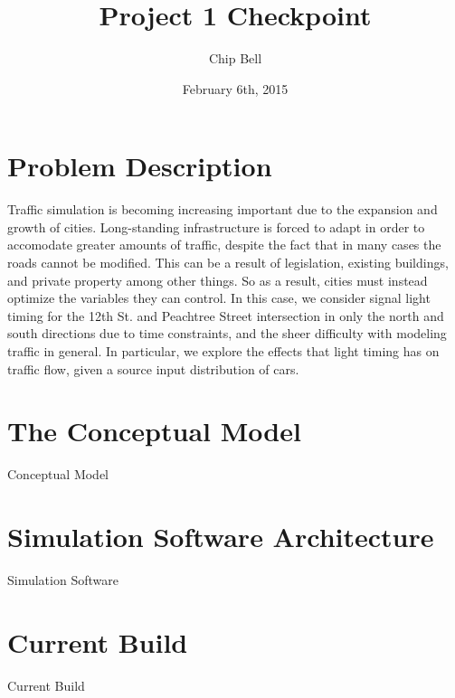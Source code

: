 \documentclass[a4paper,12pt]{article}
\begin{document}
\title{Project 1 Checkpoint}
\author{Chip Bell}
\date{February 6th, 2015}
\maketitle

\section{Problem Description}
Traffic simulation is becoming increasing important due to the expansion and growth of cities. Long-standing
infrastructure is forced to adapt in order to accomodate greater amounts of traffic, despite the fact that in many
cases the roads cannot be modified. This can be a result of legislation, existing buildings, and private property among
other things. So as a result, cities must instead optimize the variables they can control. In this case, we consider
signal light timing for the 12th St. and Peachtree Street intersection in only the north and south directions due to
time constraints, and the sheer difficulty with modeling traffic in general. In particular, we explore the effects that
light timing has on traffic flow, given a source input distribution of cars.

\section{The Conceptual Model}
Conceptual Model

\section{Simulation Software Architecture}
Simulation Software

\section{Current Build}
Current Build

\cite{pde_solution}


\end{document}
